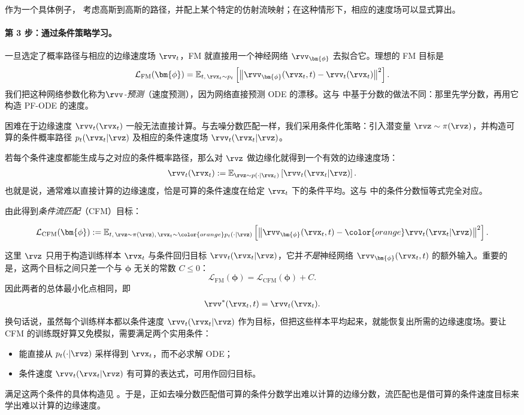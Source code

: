 作为一个具体例子， 考虑高斯到高斯的路径，并配上某个特定的仿射流映射；在这种情形下，相应的速度场可以显式算出。


\paragraph{第 3 步：通过条件策略学习。}
一旦选定了概率路径与相应的边缘速度场 $\rvv_t$，FM 就直接用一个神经网络 $\rvv_{\bm{\phi}}$ 去拟合它。理想的 FM 目标是
\[
\mathcal{L}_{\mathrm{FM}}(\bm{\phi})
=
\mathbb{E}_{t,\,\rvx_t\sim p_t}
\left[
\left\|
\rvv_{\bm{\phi}}(\rvx_t,t)
-
\rvv_t(\rvx_t)
\right\|^2
\right].
\]
我们把这种网络参数化称为\emph{$\rvv$-预测}（速度预测），因为网络直接预测 ODE 的漂移。这与  中基于分数的做法不同：那里先学分数，再用它构造 PF-ODE 的速度。

困难在于边缘速度 $\rvv_t(\rvx_t)$ 一般无法直接计算。与去噪分数匹配一样，我们采用条件化策略：引入潜变量 $\rvz\sim\pi(\rvz)$，并构造可算的条件概率路径 $p_t(\rvx_t|\rvz)$ 及相应的条件速度场 $\rvv_t(\rvx_t|\rvz)$。

若每个条件速度都能生成与之对应的条件概率路径，那么对 $\rvz$ 做边缘化就得到一个有效的边缘速度场：
\begin{align}\label{eq:marginal-oracle-velocity}
\rvv_t(\rvx_t)
:=
\mathbb{E}_{\rvz\sim p(\cdot|\rvx_t)}
\left[
\rvv_t(\rvx_t|\rvz)
\right].
\end{align}
也就是说，通常难以直接计算的边缘速度，恰是可算的条件速度在给定 $\rvx_t$ 下的条件平均。这与  中的条件分数恒等式完全对应。

由此得到\emph{条件流匹配}（CFM）目标：
\begin{mdframed}
\begin{align}\label{eq:fm-cfm}
\mathcal{L}_{\mathrm{CFM}}(\bm{\phi})
:=
\mathbb{E}_{t,\,\rvz\sim\pi(\rvz),\,
\rvx_t\sim{\color{orange}p_t(\cdot|\rvz)}}
\left[
\left\|
\rvv_{\bm{\phi}}(\rvx_t,t)
-
{\color{orange}\rvv_t(\rvx_t|\rvz)}
\right\|^2
\right].
\end{align}
\end{mdframed}
这里 $\rvz$ 只用于构造训练样本 $\rvx_t$ 与条件回归目标 $\rvv_t(\rvx_t|\rvz)$，它并\emph{不是}神经网络 $\rvv_{\bm{\phi}}(\rvx_t,t)$ 的额外输入。重要的是，这两个目标之间只差一个与 $\bm{\phi}$ 无关的常数 $C\leq0$：
\[
\mathcal{L}_{\mathrm{FM}}(\bm{\phi})
=
\mathcal{L}_{\mathrm{CFM}}(\bm{\phi})
+
C.
\]
因此两者的总体最小化点相同，即
\begin{align}\label{eq:minimum_velocity}
\rvv^*(\rvx_t,t)
=
\rvv_t(\rvx_t).
\end{align}
换句话说，虽然每个训练样本都以条件速度 $\rvv_t(\rvx_t|\rvz)$ 作为目标，但把这些样本平均起来，就能恢复出所需的边缘速度场。要让 CFM 的训练既好算又免模拟，需要满足两个实用条件：
\begin{itemize}
    \item[(i)] 能直接从 $p_t(\cdot|\rvz)$ 采样得到 $\rvx_t$，而不必求解 ODE；
    \item[(ii)] 条件速度 $\rvv_t(\rvx_t|\rvz)$ 有可算的表达式，可用作回归目标。
\end{itemize}
满足这两个条件的具体构造见 。于是，正如去噪分数匹配借可算的条件分数学出难以计算的边缘分数，流匹配也是借可算的条件速度目标来学出难以计算的边缘速度。


